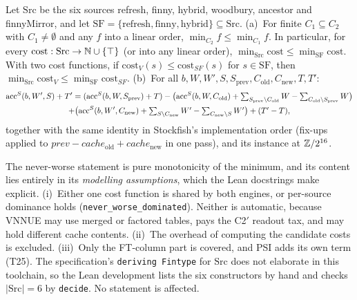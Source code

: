 \begin{theorem}\label{thm:t24}
Let $\mathrm{Src}$ be the six sources refresh, finny, hybrid, woodbury, ancestor and finnyMirror, and let $\mathrm{SF}=\{\text{refresh},\text{finny},\text{hybrid}\}\subseteq\mathrm{Src}$.
(a)~For finite $C_1\subseteq C_2$ with $C_1\neq\emptyset$ and any $f$ into a linear order, $\min_{C_2}f\le\min_{C_1}f$.
In particular, for every $\mathrm{cost}:\mathrm{Src}\to\mathbb{N}\cup\{\top\}$ (or into any linear order), $\min_{\mathrm{Src}}\mathrm{cost}\le\min_{\mathrm{SF}}\mathrm{cost}$.
With two cost functions, if $\mathrm{cost}_V(s)\le\mathrm{cost}_{SF}(s)$ for $s\in\mathrm{SF}$, then $\min_{\mathrm{Src}}\mathrm{cost}_V\le\min_{\mathrm{SF}}\mathrm{cost}_{SF}$.
(b)~For all $b,W,W',S,S_{\text{prev}},C_{\text{old}},C_{\text{new}},T,T'$:
\begin{multline*}
\mathrm{acc}^{S}(b,W',S)+T'=(\mathrm{acc}^{S}(b,W,S_{\text{prev}})+T)
-\big(\mathrm{acc}^{S}(b,W,C_{\text{old}})+\textstyle\sum_{S_{\text{prev}}\setminus C_{\text{old}}}W-\sum_{C_{\text{old}}\setminus S_{\text{prev}}}W\big)\\
+\big(\mathrm{acc}^{S}(b,W',C_{\text{new}})+\textstyle\sum_{S\setminus C_{\text{new}}}W'-\sum_{C_{\text{new}}\setminus S}W'\big)+(T'-T),
\end{multline*}
together with the same identity in Stockfish's implementation order (fix-ups applied to $\mathit{prev}-\mathit{cache}_{\text{old}}+\mathit{cache}_{\text{new}}$ in one pass), and its instance at $\mathbb{Z}/2^{16}$.
\end{theorem}
\noindent The never-worse statement is pure monotonicity of the minimum, and its content lies entirely in its \emph{modelling assumptions}, which the Lean docstrings make explicit.
(i)~Either one cost function is shared by both engines, or per-source dominance holds (\texttt{never\_worse\_dominated}). Neither is automatic, because VNNUE may use merged or factored tables, pays the C2$'$ readout tax, and may hold different cache contents.
(ii)~The overhead of computing the candidate costs is excluded.
(iii)~Only the FT-column part is covered, and PSI adds its own term (T25).
The specification's \texttt{deriving Fintype} for $\mathrm{Src}$ does not elaborate in this toolchain, so the Lean development lists the six constructors by hand and checks $|\mathrm{Src}|=6$ by \texttt{decide}. No statement is affected.

